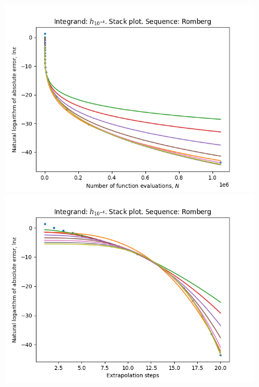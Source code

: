 \begin{figure}[H]
\centering
\begin{minipage}{0.45\textwidth}
\centering
\includegraphics[scale=0.45]{../results/romberg_plots/h_tenthousandth_hp_romberg_stack.png}
\end{minipage}
\begin{minipage}{0.45\textwidth}
\centering
\includegraphics[scale=0.45]{../results/romberg_plots/h_tenthousandth_hp_romberg_steps_stack.png}
\end{minipage}
\end{figure}

